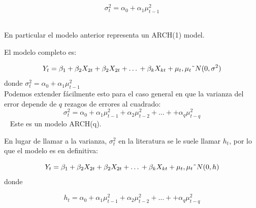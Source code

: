 	\begin{equation}
	\sigma_t^2 = \alpha_0 + \alpha_1 \mu^2_{t-1}
	\end{equation} 
	
	En particular el modelo anterior representa un ARCH(1) model.
	
	

	
El modelo completo es:
	
\begin{equation}
	Y_t = \beta_1 + \beta_2 X_{2t} + \beta_2 X_{2t} + \dots{} + \beta_k X_{kt} +\mu_t, \mu_t \string~N(0,\sigma^2)
\end{equation}
\vspace{2mm}	
donde $\sigma_t^2 = \alpha_0 + \alpha_1 \mu^2_{t-1}$
\vspace{2mm}\\	
Podemos extender f\'acilmente esto para el caso general en que la varianza del error depende de $q$ rezagos de errores al cuadrado:
	\begin{equation}
	\sigma_t^2 = \alpha_0 + \alpha_1 \mu^2_{t-1} + \alpha_2 \mu^2_{t-2} + \dots{} + + \alpha_q \mu^2_{t-q}
	\end{equation} 
Este es un modelo ARCH(q).
	

	
	En lugar de llamar a la varianza, $\sigma^2_t$ en la literatura se le suele llamar $h_t$, por lo que el modelo es en definitiva:
	
	\begin{equation}
	Y_t = \beta_1 + \beta_2 X_{2t} + \beta_2 X_{2t} + \dots{} + \beta_k X_{kt} +\mu_t, \mu_t \string~N(0,h)
	\end{equation}
	\vspace{2mm}	
	donde 
	
	\begin{equation}
	h_t = \alpha_0 + \alpha_1 \mu^2_{t-1} + \alpha_2 \mu^2_{t-2} + \dots{} + + \alpha_q \mu^2_{t-q}
	\end{equation} 
	
